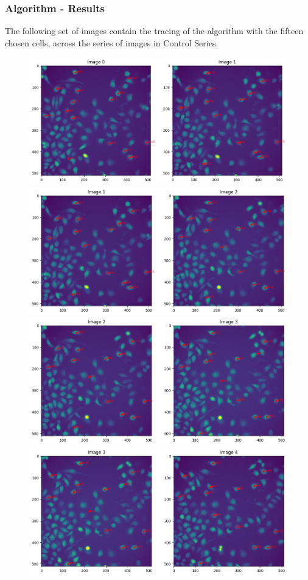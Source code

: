 \documentclass{article}
\begin{document}
\subsubsection*{Algorithm - Results}
The following set of images contain the tracing of the algorithm with the fifteen chosen cells, across the series of images in Control Series. 
\begin{figure}[h!]
\centering
\includegraphics[width=0.7\linewidth]{Report/RImages/Traces_Control/image_1a.png}
\includegraphics[width=0.7\linewidth]{Report/RImages/Traces_Control/image_2a.png}
\includegraphics[width=0.7\linewidth]{Report/RImages/Traces_Control/image_3a.png}
\includegraphics[width=0.7\linewidth]{Report/RImages/Traces_Control/image_4a.png}
\end{figure}
\end{document}
